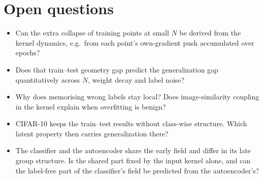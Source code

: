 \documentclass[10pt]{article}
\begin{document}
\section{Open questions}
\begin{itemize}
\item Can the extra collapse of training points at small $N$ be derived from the kernel dynamics, e.g.\ from each point's own-gradient push accumulated over epochs?
\item Does that train--test geometry gap predict the generalization gap quantitatively across $N$, weight decay and label noise?
\item Why does memorising wrong labels stay local? Does image-similarity coupling in the kernel explain when overfitting is benign?
\item CIFAR-10 keeps the train--test results without class-wise structure. Which latent property then carries generalization there?
\item The classifier and the autoencoder share the early field and differ in its late group structure. Is the shared part fixed by the input kernel alone, and can the label-free part of the classifier's field be predicted from the autoencoder's?
\end{itemize}


\end{document}
